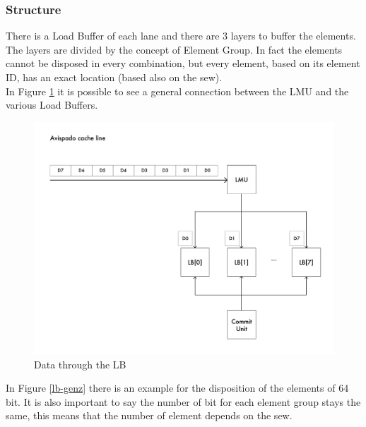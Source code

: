 \subsubsection{Structure}
There is a Load Buffer of each lane and there are 3 layers to buffer the elements. The layers are divided by the concept of Element Group. In fact the elements cannot be disposed in every combination, but every element, based on its element ID, has an exact location (based also on the sew).\\

In Figure \ref{gen-ex} it is possible to see a general connection between the LMU and the various Load Buffers.\\

\begin{figure}[H]
    \centering
    \includegraphics[scale = 0.5]{Chapter_2/img/cache-to-lb-gen-ex.png}
    \caption{Data through the LB}
    \label{gen-ex}
\end{figure}


In Figure \ref{lb-genz} there is an example for the disposition of the elements of 64 bit. It is also important to say the number of bit for each element group stays the same, this means that the number of element depends on the sew.\\



